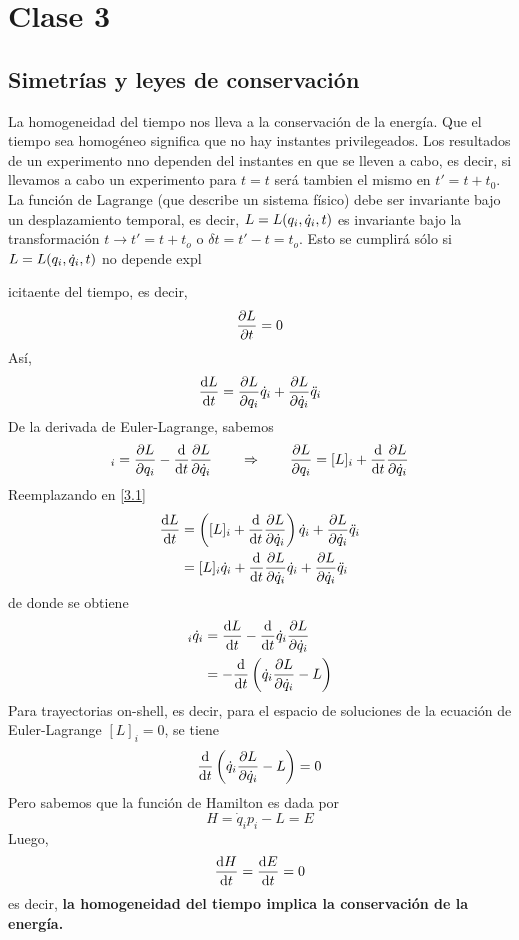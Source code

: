 \section{Clase 3}
\subsection{Simetrías y leyes de conservación}
La homogeneidad del tiempo nos lleva a la conservación de la energía. Que el tiempo sea homogéneo significa que no hay instantes privilegeados. Los resultados de un experimento nno dependen del instantes en que se lleven a cabo, es decir, si llevamos a cabo un experimento para $t=t$ será tambien el mismo en $t'=t+t_0$. La función de Lagrange (que describe un sistema físico) debe ser invariante bajo un desplazamiento temporal, es decir, $L=L(q_i,\dot{q}_i,t)$ es invariante bajo la transformación $t\to t'=t+t_o$ o $\delta t=t'-t=t_o$. Esto se cumplirá sólo si $L=L(q_i,\dot{q}_i,t)$ no depende expl{icitaente del tiempo, es decir,
\begin{equation}
  \pdv{L}{t}=0
\end{equation}
Así,
\begin{equation}\label{3.1}
  \dv{L}{t}=\pdv{L}{q_i}\dot{q}_i+\pdv{L}{\dot{q}_i}\ddot{q}_i
\end{equation}
De la derivada de Euler-Lagrange, sabemos
\begin{equation}
  [L]_i=\pdv{L}{q_i}-\dv{t}\pdv{L}{\dot{q}_i}\qquad \Rightarrow\qquad \pdv{L}{q_i}=[L]_i+\dv{t}\pdv{L}{\dot{q}_i}
\end{equation}
Reemplazando en \eqref{3.1}
\begin{align}
  \dv{L}{t}&=\left([L]_i+\dv{t}\pdv{L}{\dot{q}_i}\right)\dot{q}_i+\pdv{L}{\dot{q}_i}\ddot{q}_i\\
  &=[L]_i\dot{q}_i+\dv{t}\pdv{L}{\dot{q}_i}\dot{q}_i+\pdv{L}{\dot{q}_i}\ddot{q}_i
\end{align}
de donde se obtiene
\begin{align}
  [L]_i\dot{q}_i&=\dv{L}{t}-\dv{t}\dot{q}_i\pdv{L}{\dot{q}_i}\\
  &=-\dv{t}\left(\dot{q}_i\pdv{L}{\dot{q}_i}-L\right)
\end{align}
Para trayectorias on-shell, es decir, para el espacio de soluciones de la ecuación de Euler-Lagrange $[L]_i=0$, se tiene
\begin{equation}
  \dv{t}\left(\dot{q}_i\pdv{L}{\dot{q}_i}-L\right)=0
\end{equation}
Pero sabemos que la función de Hamilton es dada por
\begin{equation}
  H=\dot{q}_ip_i-L=E
\end{equation}
Luego,
\begin{equation}
  \dv{H}{t}=\dv{E}{t}=0
\end{equation}
es decir, \textbf{la homogeneidad del tiempo implica la conservación de la energía.}

}
